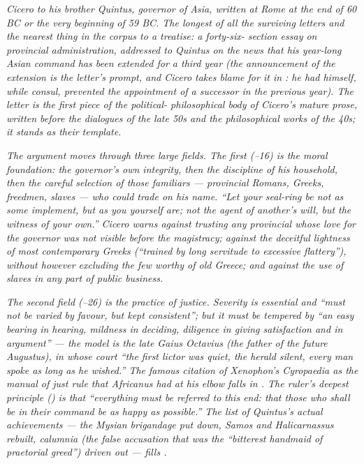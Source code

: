 
\textit{Cicero to his brother Quintus, governor of Asia,
written at Rome at the end of 60 BC or the very beginning
of 59 BC. The longest of all the surviving letters and the
nearest thing in the corpus to a treatise: a forty-six-
section essay on provincial administration, addressed to
Quintus on the news that his year-long Asian command has
been extended for a third year (the announcement of the
extension is the letter's prompt, and Cicero takes blame
for it in : he had himself, while consul,
prevented the appointment of a successor in the previous
year). The letter is the first piece of the political-
philosophical body of Cicero's mature prose, written before
the dialogues of the late 50s and the philosophical works of
the 40s; it stands as their template.}

\textit{The argument moves through three large fields. The
first (--16) is the moral foundation: the
governor's own integrity, then the discipline of his
household, then the careful selection of those familiars ---
provincial Romans, Greeks, freedmen, slaves --- who could
trade on his name. ``Let your seal-ring be not as some
implement, but as you yourself are; not the agent of
another's will, but the witness of your own.'' Cicero
warns against trusting any provincial whose love for the
governor was not visible before the magistracy; against
the deceitful lightness of most contemporary Greeks
(``trained by long servitude to excessive flattery''),
without however excluding the few worthy of old Greece;
and against the use of slaves in any part of public
business.}

\textit{The second field (--26) is the
practice of justice. Severity is essential and ``must not
be varied by favour, but kept consistent''; but it must
be tempered by ``an easy bearing in hearing, mildness in
deciding, diligence in giving satisfaction and in
argument'' --- the model is the late Gaius Octavius (the
father of the future Augustus), in whose court ``the
first lictor was quiet, the herald silent, every man
spoke as long as he wished.'' The famous citation of
Xenophon's \textit{Cyropaedia} as the manual of just rule
that Africanus had at his elbow falls in .
The ruler's deepest principle () is that
``everything must be referred to this end: that those who
shall be in their command be as happy as possible.'' The
list of Quintus's actual achievements --- the Mysian
brigandage put down, Samos and Halicarnassus rebuilt,
\textit{calumnia} (the false accusation that was the
``bitterest handmaid of praetorial greed'') driven out ---
fills .}

